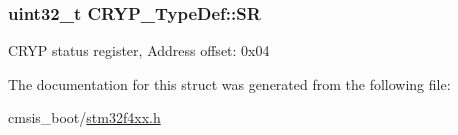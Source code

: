 \subsubsection[{\texorpdfstring{SR}{SR}}]{ uint32\+\_\+t C\+R\+Y\+P\+\_\+\+Type\+Def\+::\+SR}\hypertarget{struct_c_r_y_p___type_def_a1d5cabaf9aea97e1b6f08352bc249094}{}\label{struct_c_r_y_p___type_def_a1d5cabaf9aea97e1b6f08352bc249094}
C\+R\+YP status register, Address offset\+: 0x04 

The documentation for this struct was generated from the following file\+:\begin{DoxyCompactItemize}
\item 
cmsis\+\_\+boot/\hyperlink{stm32f4xx_8h}{stm32f4xx.\+h}\end{DoxyCompactItemize}
